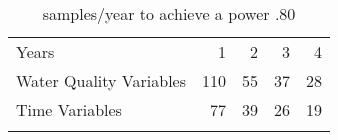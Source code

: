 \begin{table}[htbp]
\caption{samples/year to achieve a power .80}
\begin{center}
\begin{tabular}{lrrrr}
\hline\noalign{\smallskip}
Years & 1 & 2 & 3 & 4 \\ \cline{2-5}\noalign{\smallskip}
Water Quality Variables & 110 & 55 & 37 & 28 \\ 
Time Variables & 77 & 39  & 26  & 19  \\ \hline\noalign{\smallskip}
\end{tabular}
\end{center}
\label{sytaapeighty}
\end{table}